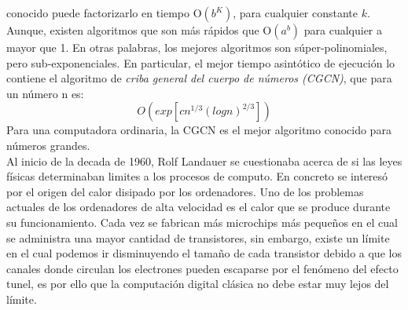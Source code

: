 conocido puede factorizarlo en tiempo O$(b^K)$, para cualquier constante $k$. Aunque, existen algoritmos que son más rápidos que O$(a^b)$ para cualquier a 
mayor que 1. En otras palabras, los mejores algoritmos son súper-polinomiales, pero sub-exponenciales. En particular, el mejor tiempo
asintótico de ejecución lo contiene el algoritmo de \textit{criba general del cuerpo de números\cite{Agrios2003} (CGCN)}, que para un número n es:
\begin{equation}
    O\left(exp\left[c n^{1/3} \left(log n\right)^{2/3} \right] \right)
    \label{eq:O(clasico)}
\end{equation}
Para una computadora ordinaria, la CGCN es el mejor algoritmo conocido para números grandes.\\
Al inicio de la decada de 1960, Rolf Landauer se cuestionaba acerca de si las leyes físicas determinaban limites a los procesos de computo. En concreto
se interesó por el origen del calor disipado por los ordenadores. Uno de los problemas actuales de los ordenadores de alta velocidad
es el calor que se produce durante su funcionamiento. Cada vez se fabrican más microchips más pequeños en el cual se administra una mayor cantidad de transistores, sin embargo, 
existe un límite en el cual podemos ir disminuyendo el tamaño de cada transistor debido a que los canales donde circulan los electrones pueden escaparse por el fenómeno del 
efecto tunel, es por ello que la computación digital clásica no debe estar muy lejos del límite.\\\\


